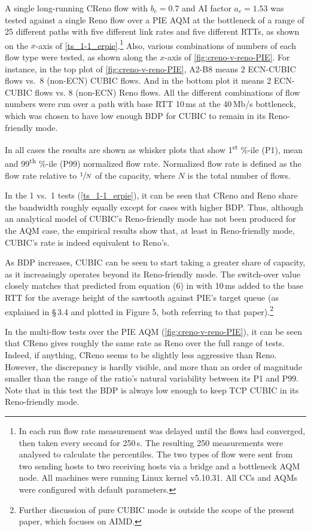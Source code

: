 A single long-running CReno flow with \(b_c = 0.7\) and AI factor \(a_c=1.53\) was tested against a single Reno flow over a PIE AQM at the bottleneck of a range of 25 different paths with five different link rates and five different RTTs, as shown on the \(x\)-axis of \autoref{ts_1-1_erpie}.\footnote{In each run flow rate measurement was delayed until the flows had converged, then taken every second for 250\,s. The resulting 250 measurements were analysed to calculate the percentiles. The two types of flow were sent from two sending hosts to two receiving hosts via a bridge and a bottleneck AQM node. All machines were running Linux kernel v5.10.31. All CCs and AQMs were configured with default parameters.} Also, various combinations of numbers of each flow type were tested, as shown along the \(x\)-axis of \autoref{fig:creno-v-reno-PIE}. For instance, in the top plot of \autoref{fig:creno-v-reno-PIE}, A2-B8 means 2 ECN-CUBIC flows vs.\ 8 (non-ECN) CUBIC flows. And in the bottom plot it means 2 ECN-CUBIC flows vs. 8 (non-ECN) Reno flows. All the different combinations of flow numbers were run over a path with base RTT 10\,ms at the 40\,Mb/s bottleneck, which was chosen to have low enough BDP for CUBIC to remain in its Reno-friendly mode. 

In all cases the results are shown as whisker plots that show 1\textsuperscript{st} \%-ile (P1), mean and 99\textsuperscript{th} \%-ile (P99) normalized flow rate. Normalized flow rate is defined as the flow rate relative to \(\sfrac{1}{N}\) of the capacity, where \(N\) is the total number of flows.

In the 1 vs.\ 1 tests (\autoref{ts_1-1_erpie}), it can be seen that CReno and Reno share the bandwidth roughly equally except for cases with higher BDP. Thus, although an analytical model of CUBIC's Reno-friendly mode has not been produced for the AQM case, the empirical results show that, at least in Reno-friendly mode, CUBIC's rate is indeed equivalent to Reno's.

As BDP increases, CUBIC can be seen to start taking a greater share of capacity, as it increasingly operates beyond its Reno-friendly mode. The switch-over value closely matches that predicted from equation (6) in \cite{Briscoe21c:pi2param} with 10\,ms added to the base RTT for the average height of the sawtooth against PIE's target queue (as explained in \S\,3.4 and plotted in Figure 5, both referring to that paper).\footnote{Further discussion of pure CUBIC mode is outside the scope of the present paper, which focuses on AIMD.}

In the multi-flow tests over the PIE AQM (\autoref{fig:creno-v-reno-PIE}), it can be seen that CReno gives roughly the same rate as Reno over the full range of tests. Indeed, if anything, CReno seems to be slightly less aggressive than Reno. However, the discrepancy is hardly visible, and more than an order of magnitude smaller than the range of the ratio's natural variability between its P1 and P99. Note that in this test the BDP is always low enough to keep TCP CUBIC in its Reno-friendly mode.


